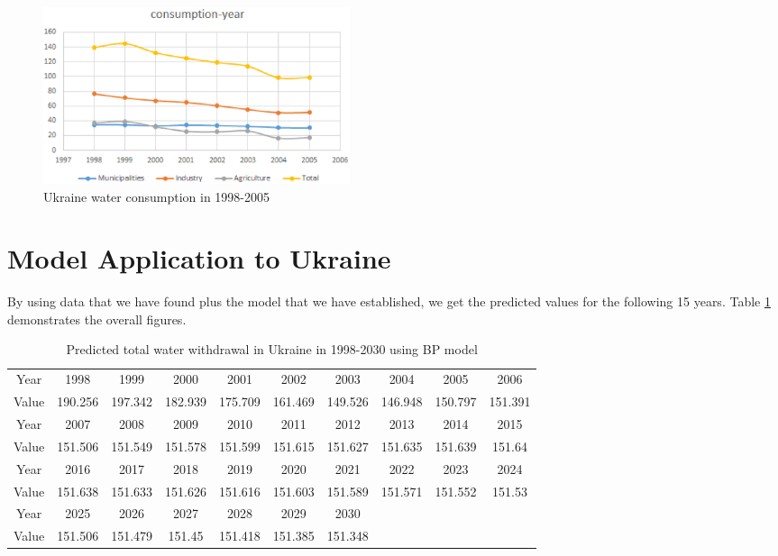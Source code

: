 \begin{figure}[hp]
\small
\centering
\includegraphics[width=9cm]{./picture/plot.eps}
\caption{Ukraine water consumption in 1998-2005} \label{plot}
\end{figure}

\section{Model Application to Ukraine}
By using data that we have found plus the model that we have established, we get the predicted values for the following 15 years. Table \ref{predicted1} demonstrates the overall figures.
\begin{table}[!htbp]
\centering\caption{Predicted total water withdrawal in Ukraine in 1998-2030 using BP model}
\begin{tabular}{c|c|c|c|c|c|c|c|c|c}
  \hline
  Year & 1998 & 1999 & 2000 & 2001 & 2002 & 2003 & 2004 & 2005 & 2006 \\
  Value & 190.256& 197.342& 182.939& 175.709& 161.469& 149.526& 146.948& 150.797& 151.391\\
  \hline
  Year & 2007 & 2008 & 2009 & 2010 & 2011 & 2012 & 2013 & 2014 & 2015 \\
  Value & 151.506& 151.549& 151.578& 151.599& 151.615& 151.627& 151.635& 151.639& 151.64\\
  \hline
  Year & 2016 & 2017 & 2018 & 2019 & 2020 & 2021 & 2022 & 2023 & 2024 \\
  Value & 151.638& 151.633& 151.626& 151.616& 151.603& 151.589& 151.571& 151.552& 151.53\\
  \hline
  Year & 2025 & 2026 & 2027 & 2028 & 2029 & 2030 & & &  \\
  Value & 151.506& 151.479& 151.45& 151.418& 151.385& 151.348 &&&\\
  \hline
\end{tabular}\label{predicted1}
\end{table}

